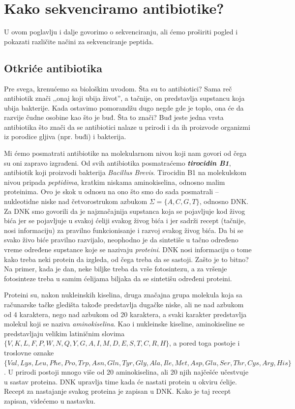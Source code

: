 \chapter{Kako sekvenciramo antibiotike?}
\setbookcodestyle


U ovom poglavlju i dalje govorimo o sekvenciranju, ali ćemo proširiti pogled i pokazati različite načini za sekvenciranje peptida. 

\section{Otkriće antibiotika}

Pre svega, krenućemo sa biološkim uvodom. Šta su to antibiotici? Sama reč antibiotik znači ,,onaj koji ubija život'', a tačnije, on predstavlja supstancu koja ubija bakterije. Kada ostavimo pomorandžu dugo negde gde je toplo, ona će da razvije čudne osobine kao što je buđ. Šta to znači? Buđ jeste jedna vrsta antibiotika što znači da se antibiotici nalaze u prirodi i da ih proizvode organizmi iz porodice gljiva (npr. buđi) i bakterija. 

Mi ćemo posmatrati antibiotike na molekularnom nivou koji nam govori od čega su oni zapravo izgrađeni. Od svih antibiotika posmatraćemo \textbf{\textit{tirocidin B1}}, antibiotik koji proizvodi bakterija \textit{Bacillus Brevis}. Tirocidin B1 na molekulskom nivou pripada \textit{peptidima}, kratkim niskama aminokiselina, odnosno malim proteinima. Ovo je skok u odnosu na ono što smo do sada posmatrali -- nukleotidne niske nad četvorostrukom azbukom $\Sigma = \{A, C, G, T\}$, odnosno DNK. Za DNK smo govorili da je najznačajnija supstanca koja se pojavljuje kod živog bića jer se pojavljuje u svakoj ćeliji svakog živog bića i jer sadrži recept (tačnije, nosi informaciju) za pravilno funkcionisanje i razvoj svakog živog bića. Da bi se svako živo biće pravilno razvijalo, neophodno je da sintetiše u tačno određeno vreme određene supstance koje se nazivaju \textit{proteini}. DNK nosi informaciju o tome kako treba neki protein da izgleda, od čega treba da se sastoji. Zašto je to bitno? Na primer, kada je dan, neke biljke treba da vrše fotosintezu, a za vršenje fotosinteze treba u samim ćelijama biljaka da se sintetišu određeni proteini.

Proteini su, nakon nukleinskih kiselina, druga značajna grupa molekula koja sa računarske tačke gledišta takođe predstavlja dugačke niske, ali ne nad azbukom od 4 karaktera, nego nad azbukom od 20 karaktera, a svaki karakter predstavlja molekul koji se naziva \textit{aminokiselina}. Kao i nukleinske kiseline, aminokiseline se predstavljaju velikim latiničnim slovima $ \{V, K, L, F, P, W, N, Q, Y, G, A, I, M, D, E, S, T, C, R, H\}$, a pored toga postoje i troslovne oznake $\{Val, Lys, Leu, Phe, Pro, Trp, Asn, Gln, Tyr, Gly, Ala, Ile, Met, Asp, Glu, Ser, Thr, Cys, Arg, His\}$. U prirodi postoji mnogo više od 20 aminokiselina, ali 20 njih najčešće učestvuje u sastav proteina. DNK upravlja time kada će nastati protein u okviru ćelije. Recept za nastajanje svakog proteina je zapisan u DNK. Kako je taj recept zapisan, videćemo u nastavku.

